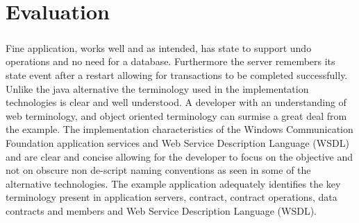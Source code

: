 \chapter{Evaluation}
		\vspace{5mm}
	    \begin{multicols}{2}
		\paragraph{}
			
			Fine application, works well and as intended, has state to support undo operations and no need for a database.  
			Furthermore the server remembers its state event after a restart allowing for transactions to be completed successfully.
			\newline
			\newline
			Unlike the java alternative the terminology used in the implementation technologies is clear and well understood.
			A developer with an understanding of web terminology, and object oriented terminology can surmise a great deal from the example.
			\newline
			\newline
			The implementation characteristics of the Windows Communication Foundation application services and Web Service Description Language (WSDL)
			and are clear and concise allowing for the developer to focus on the objective and not on obscure non de-script naming conventions as seen in some
			of the alternative technologies.
			\newline
			\newline
			The example application adequately identifies the key terminology present in application servers, contract, contract operations, data contracts 
			and members and Web Service Description Language (WSDL).
			 
		\end{multicols}
